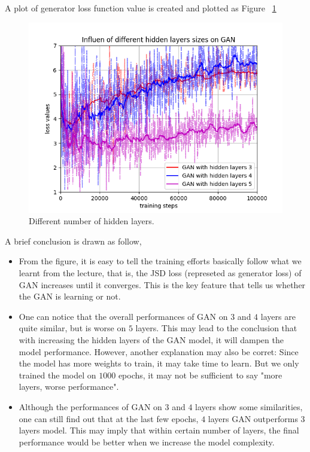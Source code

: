 \documentclass[12pt,letterpaper]{article}
\begin{document}
A plot of generator loss function value is created and plotted as Figure ~\ref{fig:gen_hidden}
\begin{figure}[h]
    \centering
    \includegraphics[width=.6\linewidth]{GAN_MNIST_hidden.png}
    \caption{\small Different number of hidden layers.}
    \label{fig:gen_hidden}
\end{figure}


A brief conclusion is drawn as follow,
\begin{itemize}
    \item From the figure, it is easy to tell the training efforts basically follow what we learnt from the lecture, that is, the JSD loss (represeted as generator loss) of GAN increases until it converges. This is the key feature that tells us whether the GAN is learning or not.
    \item One can notice that the overall performances of GAN on $3$ and $4$ layers are quite similar, but is worse on $5$ layers. This may lead to the conclusion that with increasing the hidden layers of the GAN model, it will dampen the model performance. However, another explanation may also be corret: Since the model has more weights to train, it may take time to learn. But we only trained the model on $1000$ epochs, it may not be sufficient to say "more layers, worse performance".
    \item Although the performances of GAN on $3$ and $4$ layers show some similarities, one can still find out that at the last few epochs, $4$ layers GAN outperforms $3$ layers model. This may imply that within certain number of layers, the final performance would be better when we increase the model complexity.
\end{itemize}

\end{document}
